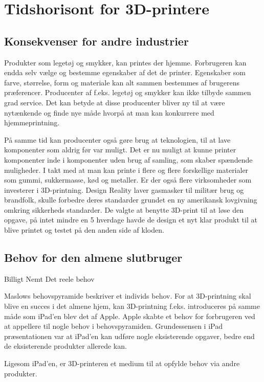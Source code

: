 
\chapter{Tidshorisont for 3D-printere}
\section{Konsekvenser for andre industrier}


Produkter som legetøj og smykker, kan printes der hjemme. Forbrugeren kan endda selv vælge og bestemme egenskaber af det de printer. Egenskaber som farve, størrelse, form og materiale kan alt sammen bestemmes af brugerens præferencer. Producenter af f.eks. legetøj og smykker kan ikke tilbyde sammen grad service. Det kan betyde at disse producenter bliver ny til at være nytænkende og finde nye måde hvorpå at man kan konkurrere med hjemmeprintning.

På samme tid kan producenter også gøre brug at teknologien, til at lave komponenter som aldrig før var muligt. Det er nu muligt at kunne printer komponenter inde i komponenter uden brug af samling, som skaber spændende muligheder.
I takt med at man kan printe i flere og flere forskellige materialer som gummi, sukkermasse, kød og metaller. Er der også flere virksomheder som investerer i 3D-printning.
Design Reality laver gasmasker til militær brug og brandfolk, skulle forbedre deres standarder grundet en ny amerikansk lovgivning omkring sikkerheds standarder. De valgte at benytte 3D-print til at løse den opgave, på intet mindre en 5 hverdage havde de design et nyt klar produkt til at blive printet og testet på den anden side af kloden.\cite{gasmasker}



\section{Behov for den almene slutbruger}

Billigt
Nemt
Det reele behov


Maslows behovspyramide \cite{abraham_harold_maslow_theory_????} beskriver et individs behov. For at 3D-printning skal blive en succes i det almene hjem, kan 3D-printning f.eks. introduceres på samme måde som iPad'en blev det af Apple. Apple skabte et behov for forbrugeren ved at appellere til nogle behov i behovspyramiden. Grundessensen i iPad præsentationen var at iPad'en kan udføre nogle eksisterende opgaver, bedre end de eksisterende produkter allerede kan.

Ligesom iPad'en, er 3D-printeren et medium til at opfylde behov via andre produkter. 